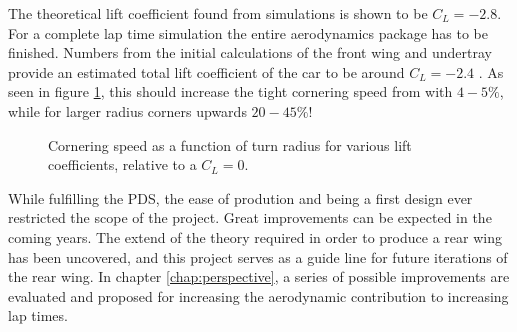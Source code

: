   The theoretical lift coefficient found from simulations is shown to be $C_L = -2.8$. For a complete lap time simulation the entire aerodynamics package has to be finished. Numbers from the initial calculations of the front wing and undertray provide an estimated total lift coefficient of the car to be around $C_L = -2.4$ \cite{lcdesign}. As seen in figure \ref{fig:cornerspeedvsliftrelative}, this should increase the tight cornering speed from with $4-5\%$, while for larger radius corners upwards $20-45\%$!

  \begin{figure}
    \caption{Cornering speed as a function of turn radius for various lift coefficients, relative to a $C_L = 0$.}
    \label{fig:cornerspeedvsliftrelative}
  \end{figure}



  While fulfilling the PDS, the ease of prodution and being a first design ever restricted the scope of the project. Great improvements can be expected in the coming years. The extend of the theory required in order to produce a rear wing has been uncovered, and this project serves as a guide line for future iterations of the rear wing.  In chapter \ref{chap:perspective}, a series of possible improvements are evaluated and proposed for increasing the aerodynamic contribution to increasing lap times.
